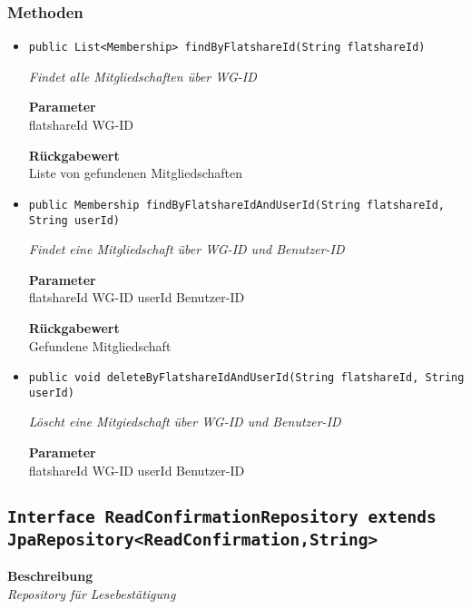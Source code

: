     \subsubsection{Methoden}
    \begin{itemize}
    	\item{\texttt{public List<Membership> findByFlatshareId(String flatshareId)}}
    	
    	\textit{Findet alle Mitgliedschaften über WG-ID}
    	
    	\textbf{Parameter} \\
    	flatshareId WG-ID
    	
    	\textbf{Rückgabewert} \\
    	Liste von gefundenen Mitgliedschaften        \item{\texttt{public Membership findByFlatshareIdAndUserId(String flatshareId, String userId)}}
    	
    	\textit{Findet eine Mitgliedschaft über WG-ID und Benutzer-ID}
    	
    	\textbf{Parameter} \\
    	flatshareId WG-ID
    	userId Benutzer-ID
    	
    	\textbf{Rückgabewert} \\
    	Gefundene Mitgliedschaft        \item{\texttt{public void deleteByFlatshareIdAndUserId(String flatshareId, String userId)}}
    	
    	\textit{Löscht eine Mitgiedschaft über WG-ID und Benutzer-ID}
    	
    	\textbf{Parameter} \\
    	flatshareId WG-ID
    	userId Benutzer-ID
    	
    	
    \end{itemize}
    \subsection{\texttt{Interface ReadConfirmationRepository extends JpaRepository<ReadConfirmation,String>}}
    \textbf{Beschreibung} \\
    \textit{Repository für Lesebestätigung}
